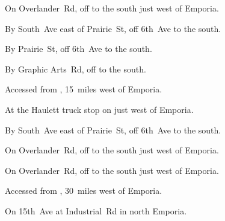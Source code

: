 

\begin{LocationList}

On Overlander~Rd, off  to the south just west of Emporia.

By South~Ave east of Prairie~St, off  6th~Ave to the south.

By Prairie~St, off  6th~Ave to the south.

By Graphic Arts~Rd, off  to the south.

Accessed from , 15~miles west of Emporia.

At the Haulett truck stop on  just west of Emporia.

By South~Ave east of Prairie~St, off  6th~Ave to the south.

On Overlander~Rd, off  to the south just west of Emporia.

On Overlander~Rd, off  to the south just west of Emporia.

Accessed from , 30~miles west of Emporia.

On 15th~Ave at Industrial~Rd in north Emporia.

\end{LocationList}

